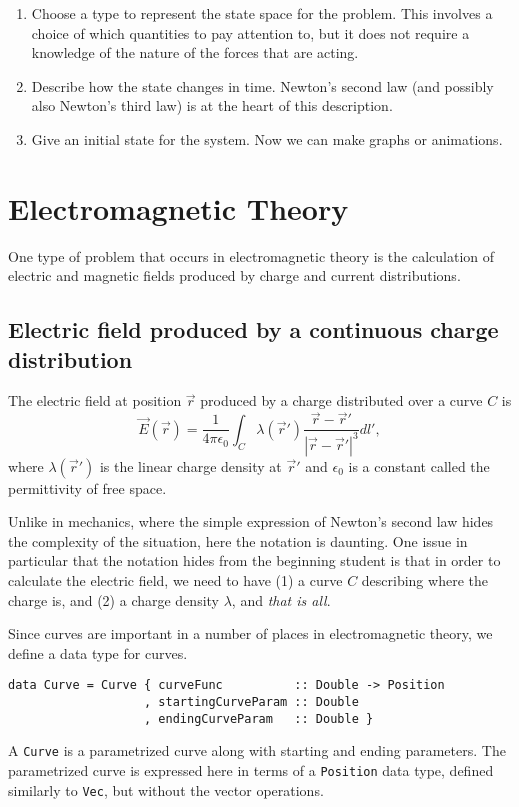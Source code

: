\documentclass{eptcs}
\newcommand{\abs}[1]{\left| #1 \right|}
\begin{document}
\begin{enumerate}
\item Choose a type to represent the state space for the problem.
This involves a choice of which quantities to pay attention to,
but it does not require a knowledge of the nature of the forces
that are acting.
\item Describe how the state changes in time.  Newton's second law
(and possibly also Newton's third law) is at the heart of this description.
\item Give an initial state for the system.
Now we can make graphs or animations.
\end{enumerate}

\section{Electromagnetic Theory}

One type of problem that occurs in electromagnetic theory is the
calculation of electric and magnetic fields produced by charge
and current distributions.

\subsection{Electric field produced by a continuous charge distribution}

The electric field at position $\vec{r}$ produced by a charge distributed over a curve $C$ is
\begin{equation}
\vec{E}(\vec{r}) = \frac{1}{4 \pi \epsilon_0} \int_C \lambda(\vec{r}') \frac{\vec{r} - \vec{r}'}{\abs{\vec{r} - \vec{r}'}^3} dl' ,
\label{efield}
\end{equation}
where $\lambda(\vec{r}')$ is the linear charge density at $\vec{r}'$
and $\epsilon_0$ is a constant called the permittivity of free space.

Unlike in mechanics, where the simple expression of Newton's second law hides
the complexity of the situation, here the notation is daunting.
One issue in particular that the notation hides from the beginning student
is that in order to calculate the electric field, we need to have (1)
a curve $C$ describing where the charge is, and (2) a charge density $\lambda$,
and \emph{that is all}.

Since curves are important in a number of places in electromagnetic theory,
we define a data type for curves.
\begin{verbatim}
data Curve = Curve { curveFunc          :: Double -> Position
                   , startingCurveParam :: Double
                   , endingCurveParam   :: Double }
\end{verbatim}
A \verb|Curve| is a parametrized curve along with starting and ending
parameters.  The parametrized curve is expressed here in terms of a
\verb|Position| data type, defined similarly to \verb|Vec|, but without
the vector operations.
\end{document}
